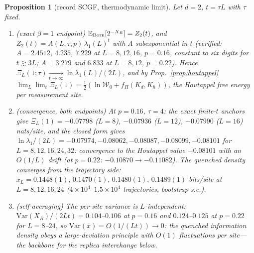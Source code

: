 \documentclass[11pt]{article}
\newtheorem{proposition}{Proposition}
\newcommand{\Wz}{\mathcal{W}_0}
\newcommand{\E}{\mathbb{E}}
\begin{document}
\begin{proposition}[record SCGF, thermodynamic limit]\label{prop:scgf}
Let $d=2$, $t=\tau L$ with $\tau$ fixed.
\begin{enumerate}
\item[(i)] \emph{(exact $\beta=1$ endpoint)} $\E_{\rm Born}[2^{-X_R}]=Z_2(t)$,
      and $Z_2(t)=A(L,\tau,p)\,\lambda_1(L)^t$ with $A$ subexponential in
      $t$ (verified: $A=2.4512$, $4.235$, $7.229$ at $L=8,12,16$, $p=0.16$,
      constant to six digits for $t\gtrsim3L$; $A=3.279$ and $6.833$ at
      $L=8,12$, $p=0.22$).  Hence
      $\Xi_L(1;\tau)\xrightarrow[t\to\infty]{}\ln\lambda_1(L)/(2L)$, and by
      Prop.~\ref{prop:houtappel}
      $\lim_L\lim_t\Xi_L(1)=\tfrac12(\ln\Wz+f_H(K_d,K_h))$, the Houtappel
      free energy per measurement site.
\item[(ii)] \emph{(convergence, both endpoints)} At $p=0.16$, $\tau=4$:
      the exact finite-$t$ anchors give
      $\Xi_L(1)=-0.07798$ ($L=8$), $-0.07936$ ($L=12$), $-0.07990$ ($L=16$)
      nats/site, and the
      closed form gives $\ln\lambda_1/(2L)=-0.07974,-0.08062,-0.08087,
      -0.08099,-0.08101$ for $L=8,12,16,24,32$: convergence to the
      Houtappel value $-0.08101$ with an $O(1/L)$ drift (at $p=0.22$:
      $-0.10870\to-0.11082$).  The quenched density converges from the
      trajectory side:
      $\bar x_L=0.1448(1),\,0.1470(1),\,0.1480(1),\,0.1489(1)$ bits/site at
      $L=8,12,16,24$ ($4\times10^4$--$1.5\times10^4$ trajectories,
      bootstrap s.e.).
\item[(iii)] \emph{(self-averaging)} The per-site variance is
      $L$-independent: $\mathrm{Var}(X_R)/(2Lt)=0.104$--$0.106$ at
      $p=0.16$ and $0.124$--$0.125$ at $p=0.22$ for $L=8$--$24$, so
      $\mathrm{Var}(\bar x)=O(1/(Lt))\to0$: the quenched information
      density obeys a large-deviation principle with $O(1)$ fluctuations
      per site---the backbone for the replica interchange below.
\end{enumerate}
\end{proposition}
\end{document}
